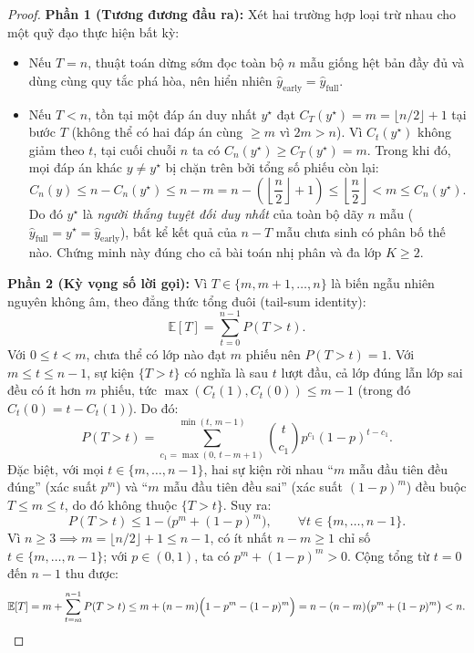 \begin{proof}
\textbf{Phần 1 (Tương đương đầu ra):} Xét hai trường hợp loại trừ nhau cho một quỹ đạo thực hiện bất kỳ:
\begin{itemize}
  \item Nếu $T = n$, thuật toán dừng sớm đọc toàn bộ $n$ mẫu giống hệt bản đầy đủ và dùng cùng quy tắc phá hòa, nên hiển nhiên $\hat{y}_{\text{early}} = \hat{y}_{\text{full}}$.
  \item Nếu $T < n$, tồn tại một đáp án duy nhất $y^\star$ đạt $C_T(y^\star) = m = \lfloor n/2 \rfloor + 1$ tại bước $T$ (không thể có hai đáp án cùng $\ge m$ vì $2m > n$). Vì $C_t(y^\star)$ không giảm theo $t$, tại cuối chuỗi $n$ ta có $C_n(y^\star) \ge C_T(y^\star) = m$. Trong khi đó, mọi đáp án khác $y \neq y^\star$ bị chặn trên bởi tổng số phiếu còn lại:
  \[
    C_n(y) \le n - C_n(y^\star) \le n - m = n - \left(\left\lfloor \frac{n}{2} \right\rfloor + 1\right) \le \left\lfloor \frac{n}{2} \right\rfloor < m \le C_n(y^\star).
  \]
  Do đó $y^\star$ là \emph{người thắng tuyệt đối duy nhất} của toàn bộ dãy $n$ mẫu ($\hat{y}_{\text{full}} = y^\star = \hat{y}_{\text{early}}$), bất kể kết quả của $n - T$ mẫu chưa sinh có phân bố thế nào. Chứng minh này đúng cho cả bài toán nhị phân và đa lớp $K \ge 2$.
\end{itemize}

\textbf{Phần 2 (Kỳ vọng số lời gọi):} Vì $T \in \{m, m+1, \dots, n\}$ là biến ngẫu nhiên nguyên không âm, theo đẳng thức tổng đuôi (tail-sum identity):
\[
  \mathbb{E}[T] = \sum_{t=0}^{n-1} P(T > t).
\]
Với $0 \le t < m$, chưa thể có lớp nào đạt $m$ phiếu nên $P(T > t) = 1$. Với $m \le t \le n - 1$, sự kiện $\{T > t\}$ có nghĩa là sau $t$ lượt đầu, cả lớp đúng lẫn lớp sai đều có ít hơn $m$ phiếu, tức $\max(C_t(1), C_t(0)) \le m - 1$ (trong đó $C_t(0) = t - C_t(1)$). Do đó:
\[
  P(T > t) = \sum_{c_1 = \max(0,\, t - m + 1)}^{\min(t,\, m - 1)} \binom{t}{c_1} p^{c_1}(1 - p)^{t - c_1}.
\]
Đặc biệt, với mọi $t \in \{m, \dots, n - 1\}$, hai sự kiện rời nhau ``$m$ mẫu đầu tiên đều đúng'' (xác suất $p^m$) và ``$m$ mẫu đầu tiên đều sai'' (xác suất $(1 - p)^m$) đều buộc $T \le m \le t$, do đó không thuộc $\{T > t\}$. Suy ra:
\[
  P(T > t) \le 1 - \bigl(p^m + (1 - p)^m\bigr), \qquad \forall t \in \{m, \dots, n - 1\}.
\]
Vì $n \ge 3 \implies m = \lfloor n/2 \rfloor + 1 \le n - 1$, có ít nhất $n - m \ge 1$ chỉ số $t \in \{m, \dots, n-1\}$; với $p \in (0, 1)$, ta có $p^m + (1 - p)^m > 0$. Cộng tổng từ $t = 0$ đến $n - 1$ thu được:
\[
  \mathbb{E}[T] = m + \sum_{t=m}^{n-1} P(T > t) \le m + (n - m)\Bigl(1 - p^m - (1 - p)^m\Bigr) = n - (n - m)\bigl(p^m + (1 - p)^m\bigr) < n.
\]
\end{proof}

